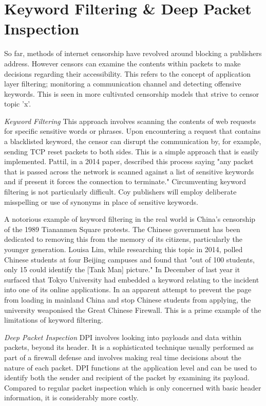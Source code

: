 \section{Keyword Filtering \& Deep Packet Inspection}
So far, methods of internet censorship have revolved around blocking a publishers address. However censors can examine the contents within packets to make decisions regarding their accessibility. This refers to the concept of application layer filtering; monitoring a communication channel and detecting offensive keywords. This is seen in more cultivated censorship models that strive to censor topic 'x'. 

\textit{Keyword Filtering} This approach involves scanning the contents of web requests for specific sensitive words or phrases. Upon encountering a request that contains a blacklisted keyword, the censor can disrupt the communication by, for example, sending TCP reset packets to both sides. This is a simple approach that is easily implemented. Pattil, in a 2014 paper, described this process saying "any packet that is passed across the network is scanned against a list of sensitive keywords and if present it forces the connection to terminate." \cite{uta-cse-1227} Circumventing keyword filtering is not particularly difficult. Coy publishers will employ deliberate misspelling or use of synonyms in place of sensitive keywords. 

A notorious example of keyword filtering in the real world is China's censorship of the 1989 Tiananmen Square protests. The Chinese government has been dedicated to removing this from the memory of its citizens, particularly the younger generation. \cite{nsarchive2001tiananmen} Louisa Lim, while researching this topic in 2014, polled Chinese students at four Beijing campuses and found that "out of 100 students, only 15 could identify the [Tank Man] picture." \cite{lim2014amnesia} In December of last year it surfaced that Tokyo University had embedded a keyword relating to the incident into one of its online applications. In an apparent attempt to prevent the page from loading in mainland China and stop Chinese students from applying, the university weaponised the Great Chinese Firewall. This is a prime example of the limitations of keyword filtering. \cite{unseenjapan2023tiananmen}

\textit{Deep Packet Inspection} DPI involves looking into payloads and data within packets, beyond its header. It is a sophisticated technique usually performed as part of a firewall defense and involves making real time decisions about the nature of each packet. DPI functions at the application level and can be used to identify both the sender and recipient of the packet by examining its payload. Compared to regular packet inspection which is only concerned with basic header information, it is considerably more costly. 

